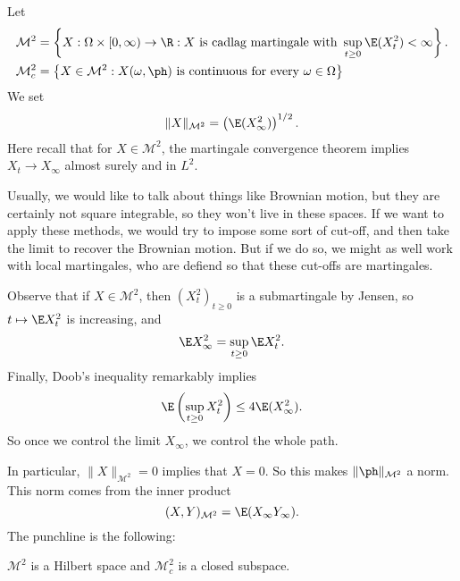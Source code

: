 \documentclass[a4paper]{article}
\begin{document}
\begin{defi}[$\mathcal{M}^2$]
  Let
  \begin{align*}
    \mathcal{M}^2 &= \left\{X : \Omega \times [0, \infty) \to \R : X\text{ is cadlag martingale with } \sup_{t \geq 0} \E(X_t^2) < \infty\right\}.\\
    \mathcal{M}^2_c &= \left\{X \in \mathcal{M}^2: X(\omega, \ph)\text{ is continuous for every }\omega \in \Omega\right\}
  \end{align*}
  We set
  \[
    \|X\|_{\mathcal{M}^2} = \left(\E(X_\infty^2)\right)^{1/2}.
  \]
  Here recall that for $X \in \mathcal{M}^2$, the martingale convergence theorem implies $X_t \to X_\infty$ almost surely and in $L^2$.
\end{defi}
Usually, we would like to talk about things like Brownian motion, but they are certainly not square integrable, so they won't live in these spaces. If we want to apply these methods, we would try to impose some sort of cut-off, and then take the limit to recover the Brownian motion. But if we do so, we might as well work with local martingales, who are defiend so that these cut-offs are martingales.

Observe that if $X \in \mathcal{M}^2$, then $(X_t^2)_{t \geq 0}$ is a submartingale by Jensen, so $t \mapsto \E X_t^2$ is increasing, and
\[
  \E X_\infty^2 = \sup_{t \geq 0} \E X_t^2.
\]
Finally, Doob's inequality remarkably implies
\[
  \E \left(\sup_{t \geq 0} X_t^2\right) \leq 4 \E(X_\infty^2).
\]
So once we control the limit $X_\infty$, we control the whole path.

In particular, $\|X\|_{\mathcal{M}^2} = 0$ implies that $X = 0$. So this makes $\|\ph\|_{\mathcal{M}^2}$ a norm. This norm comes from the inner product
\[
  (X, Y)_{\mathcal{M}^2} = \E(X_\infty Y_\infty).
\]
The punchline is the following:
\begin{thm}
  $\mathcal{M}^2$ is a Hilbert space and $\mathcal{M}_c^2$ is a closed subspace.
\end{thm}
\end{document}
